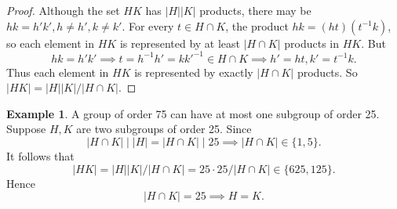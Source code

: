 \documentclass{article}
\newtheorem{theorem}{Theorem}[section]
\theoremstyle{definition}
\newtheorem{example}{Example}[section]
\begin{document}
     \noindent{}
     
     \begin{proof}
        Although the set $HK$ has $|H||K|$ products, there may be $hk = h'k', h \neq h', k \neq k'$. For every $t \in H \cap K$, the product $hk = (ht)(t^{-1}k)$, so each element in $HK$ is represented by at least $|H\cap K|$ products in $HK$. But
        \begin{equation*}
            hk = h'k' \implies t = h^{-1}h' = kk'^{-1} \in H \cap K \implies h' = ht, k' = t^{-1}k.
        \end{equation*}
        Thus each element in $HK$ is represented by exactly $|H \cap K|$ products. So $|HK| = |H||K|/|H \cap K|$.
     \end{proof}
     
     \begin{example}
         A group of order 75 can have at most one subgroup of order 25. Suppose $H, K$ are two subgroups of order 25. Since 
         \begin{equation*}
             |H \cap K| \mid |H| = |H \cap K| \mid 25 \implies |H \cap K| \in \{1,5\}.
         \end{equation*}
         It follows that
         \begin{equation*}
             |HK| = |H||K|/|H \cap K| = 25\cdot25/|H\cap K| \in \{625,125\}.
         \end{equation*}
         Hence
         \begin{equation*}
             |H \cap K| = 25 \implies H=K.
         \end{equation*}
     \end{example}
     
     \noindent{}
     
\end{document}
